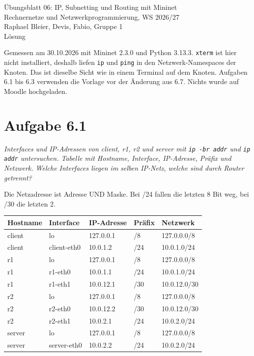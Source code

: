 \documentclass[a4paper,11pt]{article}
\newif\ifexplain
\newcommand{\aufgabe}[1]{\section*{Aufgabe #1}}
\newcommand{\angabe}[1]{{\raggedright\textit{#1}\par}\smallskip}
\newcommand{\explain}[1]{\ifexplain\begin{erklbox}#1\end{erklbox}\fi}
\begin{document}
\begin{center}
{\Large Übungsblatt 06: IP, Subnetting und Routing mit Mininet}\\
Rechnernetze und Netzwerkprogrammierung, WS 2026/27\\
Raphael Bleier, Devis, Fabio, Gruppe 1\\
\ifexplain Erklärung\else Lösung\fi
\end{center}
Gemessen am 30.10.2026 mit Mininet 2.3.0 und Python 3.13.3. \texttt{xterm} ist hier nicht installiert, deshalb liefen \texttt{ip} und \texttt{ping} in den Netzwerk-Namespaces der Knoten. Das ist dieselbe Sicht wie in einem Terminal auf dem Knoten. Aufgaben 6.1 bis 6.3 verwenden die Vorlage vor der Änderung aus 6.7. Nichts wurde auf Moodle hochgeladen.

\explain{Die Vorlage setzt die Adressen nicht in \texttt{topology.py}, sondern in \texttt{start\_lab.py}. Deshalb stehen in 6.1 bis 6.3 die Werte aus \texttt{configure\_base\_network}, nicht geratene Adressen. Die Bridge aus 6.7 ist in diesen Messungen noch nicht drin.}

\aufgabe{6.1}
\angabe{Interfaces und IP-Adressen von client, r1, r2 und server mit \texttt{ip -br addr} und \texttt{ip addr} untersuchen. Tabelle mit Hostname, Interface, IP-Adresse, Präfix und Netzwerk. Welche Interfaces liegen im selben IP-Netz, welche sind durch Router getrennt?}
Die Netzadresse ist Adresse UND Maske. Bei /24 fallen die letzten 8 Bit weg, bei /30 die letzten 2.

\begin{center}
\small
\begin{tabular}{@{}lllll@{}}
\toprule
Hostname & Interface & IP-Adresse & Präfix & Netzwerk \\
\midrule
client & lo & 127.0.0.1 & /8 & 127.0.0.0/8 \\
client & client-eth0 & 10.0.1.2 & /24 & 10.0.1.0/24 \\
r1 & lo & 127.0.0.1 & /8 & 127.0.0.0/8 \\
r1 & r1-eth0 & 10.0.1.1 & /24 & 10.0.1.0/24 \\
r1 & r1-eth1 & 10.0.12.1 & /30 & 10.0.12.0/30 \\
r2 & lo & 127.0.0.1 & /8 & 127.0.0.0/8 \\
r2 & r2-eth0 & 10.0.12.2 & /30 & 10.0.12.0/30 \\
r2 & r2-eth1 & 10.0.2.1 & /24 & 10.0.2.0/24 \\
server & lo & 127.0.0.1 & /8 & 127.0.0.0/8 \\
server & server-eth0 & 10.0.2.2 & /24 & 10.0.2.0/24 \\
\bottomrule
\end{tabular}
\end{center}
\end{document}
